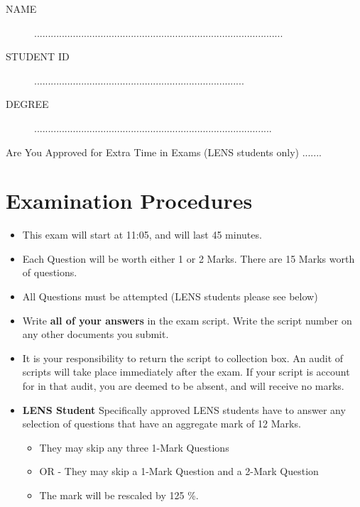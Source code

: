 \documentclass[11pt]{article} %
\begin{document}
	
	
	
	
	\Large
\newpage

\begin{framed}
\begin{description}
\item[NAME]  ..........................................................................................
\bigskip
\item[STUDENT ID] ............................................................................
\bigskip
\item[DEGREE] ......................................................................................
\end{description}
\end{framed}
Are You Approved for Extra Time in Exams (LENS students only)  .......
\section*{Examination Procedures}
\begin{itemize} 
	\item This exam will start at 11:05, and will last 45 minutes.
		\item Each Question will be worth either 1 or 2 Marks. There are 15 Marks worth of questions.
	\item All Questions must be attempted (LENS students please see below)
		\item Write \textbf{all of your answers} in the exam script. Write the script number on any other documents you submit.
		\item It is your responsibility to return the script to collection box. An audit of scripts will take place immediately after the exam. If your script is account for in that audit,  you are deemed to be absent, and will receive no marks.
	
	\item \textbf{LENS Student}
	Specifically approved LENS students have to answer any selection of questions that have an aggregate mark of 12 Marks.  
	\begin{itemize}
		\item They may skip any three 1-Mark Questions
		\item OR - They may skip a 1-Mark Question and a 2-Mark Question
		\item The mark will be rescaled by 125 \%.
	\end{itemize}
	
	
\end{itemize}
\end{document}
